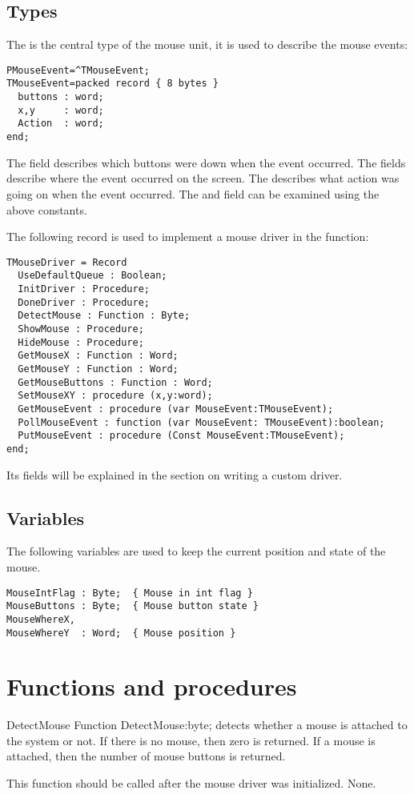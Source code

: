 \subsection{Types}
The  is the central type of the mouse unit, it is used
to describe the mouse events:
\begin{verbatim}
PMouseEvent=^TMouseEvent;
TMouseEvent=packed record { 8 bytes }
  buttons : word;
  x,y     : word;
  Action  : word;
end;
\end{verbatim}
The  field describes which buttons were down when the event
occurred. The  fields describe where the event occurred on the
screen. The  describes what action was going on when the event
occurred. The  and  field can be examined using the
above constants.

The following record is used to implement a mouse driver in the
 function:
\begin{verbatim}
TMouseDriver = Record 
  UseDefaultQueue : Boolean;
  InitDriver : Procedure;
  DoneDriver : Procedure;
  DetectMouse : Function : Byte;
  ShowMouse : Procedure;
  HideMouse : Procedure;
  GetMouseX : Function : Word;
  GetMouseY : Function : Word;
  GetMouseButtons : Function : Word;
  SetMouseXY : procedure (x,y:word);
  GetMouseEvent : procedure (var MouseEvent:TMouseEvent);
  PollMouseEvent : function (var MouseEvent: TMouseEvent):boolean;
  PutMouseEvent : procedure (Const MouseEvent:TMouseEvent); 
end;
\end{verbatim}
Its fields will be explained in the section on writing a custom driver.

\subsection{Variables}
The following variables are used to keep the current position and state of
the mouse.
\begin{verbatim}
MouseIntFlag : Byte;  { Mouse in int flag }
MouseButtons : Byte;  { Mouse button state }
MouseWhereX,
MouseWhereY  : Word;  { Mouse position }
\end{verbatim}

\section{Functions and procedures}

\begin{function}{DetectMouse}
\Declaration
Function DetectMouse:byte;
\Description
{} detects whether a mouse is attached to the system or not.
If there is no mouse, then zero is returned. If a mouse is attached, then
the number of mouse buttons is returned.

This function should be called after the mouse driver was initialized.
\Errors
None.
\SeeAlso
{}
\end{function}

